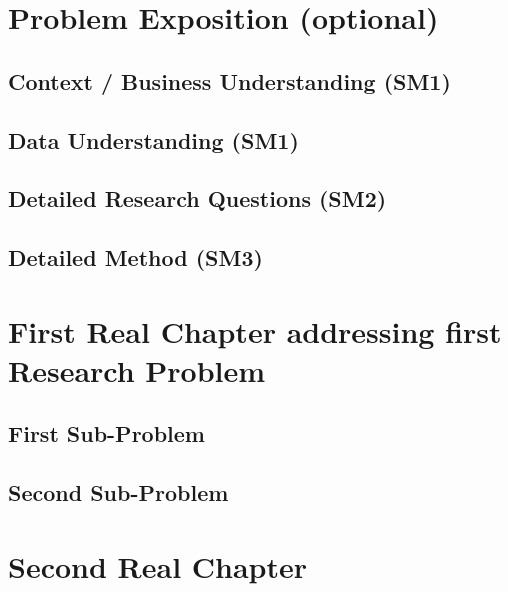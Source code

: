 \documentclass[
	a4paper,
	pagesize,
	pdftex,
	12pt,
	ngerman,
	fleqn,
	final,
	]{scrartcl}
\theoremstyle{plain}
\theoremstyle{definition}
\begin{document}
\section{Problem Exposition (optional)}
	
	\subsection{Context / Business Understanding (SM1)}
	
	\subsection{Data Understanding (SM1)}
	
	\subsection{Detailed Research Questions (SM2)}
	
	\subsection{Detailed Method (SM3)}

\section{First Real Chapter addressing first Research Problem}

	\subsection{First Sub-Problem}
	
	\subsection{Second Sub-Problem}

\section{Second Real Chapter}
\end{document}
